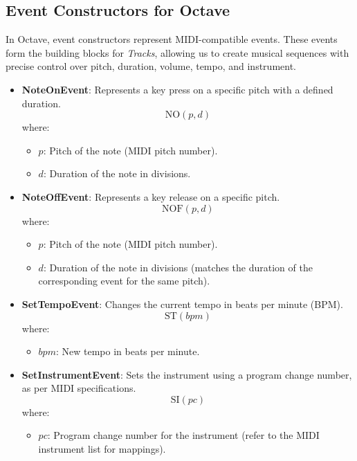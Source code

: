 \documentclass[letterpaper,12pt]{article}
\begin{document}
\subsection{Event Constructors for Octave} \label{event constructor}

In Octave, event constructors represent MIDI-compatible events. These events form the building blocks for \emph{Tracks}, allowing us to create musical sequences with precise control over pitch, duration, volume, tempo, and instrument.

\begin{itemize}
    \item \textbf{NoteOnEvent}: Represents a key press on a specific pitch with a defined duration.
    \[
    \text{NO}(p, d)
    \]
    where:
    \begin{itemize}
        \item \( p \): Pitch of the note (MIDI pitch number).
        \item \( d \): Duration of the note in divisions.
    \end{itemize}

    \item \textbf{NoteOffEvent}: Represents a key release on a specific pitch.
    \[
    \text{NOF}(p, d)
    \]
    where:
    \begin{itemize}
        \item \( p \): Pitch of the note (MIDI pitch number).
        \item \( d \): Duration of the note in divisions (matches the duration of the corresponding  event for the same pitch).
    \end{itemize}

    \item \textbf{SetTempoEvent}: Changes the current tempo in beats per minute (BPM).
    \[
    \text{ST}(bpm)
    \]
    where:
    \begin{itemize}
        \item \( bpm \): New tempo in beats per minute.
    \end{itemize}

    \item \textbf{SetInstrumentEvent}: Sets the instrument using a program change number, as per MIDI specifications.
    \[
    \text{SI}(pc)
    \]
    where:
    \begin{itemize}
        \item \( pc \): Program change number for the instrument (refer to the MIDI instrument list for mappings).
    \end{itemize}


\end{itemize}
\end{document}

